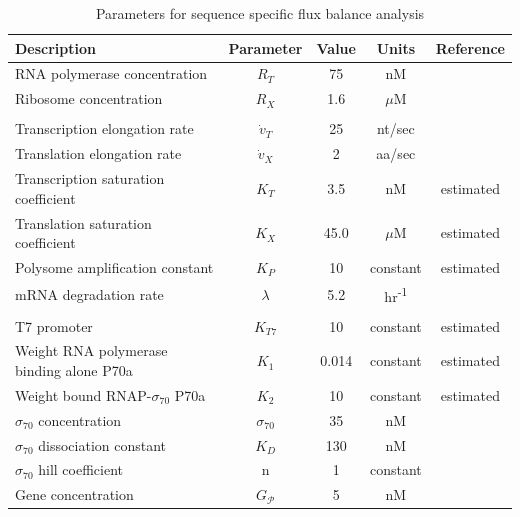 \documentclass[journal=asbcd6,manuscript=article]{achemso}
\begin{document}
\begin{table}[!]
\centering
    \caption{Parameters for sequence specific flux balance analysis}
    \renewcommand{\arraystretch}{1}
    \begin{tabular}{lcccc} \toprule
        \textbf{Description} & \textbf{Parameter} & \textbf{Value} & \textbf{Units} & \textbf{Reference} \\ \toprule
        RNA polymerase concentration & $R_{T}$ & 75 & nM & \cite{Garamella:2016aa} \\
        Ribosome concentration & $R_{X}$ & 1.6 & $\mu$M & \cite{Garamella:2016aa, 2005_underwood_biotech} \\

        & & & & \\
        Transcription elongation rate & $\dot{v}_{T}$ & 25 & nt/sec & \cite{Garamella:2016aa} \\
        Translation elongation rate & $\dot{v}_{X}$ & 2 & aa/sec & \cite{Garamella:2016aa, 2005_underwood_biotech} \\
        Transcription saturation coefficient & $K_{T}$ & 3.5 & nM & estimated \\
        Translation saturation coefficient & $K_{X}$ & 45.0 & $\mu$M & estimated \\
        Polysome amplification constant & $K_{P}$ & 10 & constant & estimated \\
        mRNA degradation rate & $\lambda$ & 5.2 & hr\textsuperscript{-1} & \cite{Garamella:2016aa} \\

        & & & & \\
        T7 promoter & $K_{T7}$ & 10 & constant & estimated \\
        Weight RNA polymerase binding alone P70a & $K_{1}$ & 0.014 & constant & estimated \\
        Weight bound RNAP-$\sigma_{70}$ P70a & $K_{2}$ & 10 & constant & estimated \\
        $\sigma_{70}$ concentration & $\sigma_{70}$ & 35 & nM & \cite{Garamella:2016aa} \\
        $\sigma_{70}$ dissociation constant & $K_{D}$ & 130 & nM & \cite{Mauri2014} \\
	      $\sigma_{70}$ hill coefficient & n & 1 & constant & \cite{Mauri2014} \\
        Gene concentration & $G_{\mathcal{P}}$ & 5 & nM &  \cite{Garamella:2016aa} \\ \bottomrule

    \end{tabular}
\label{tbl:parameters}
\end{table}
\end{document}
